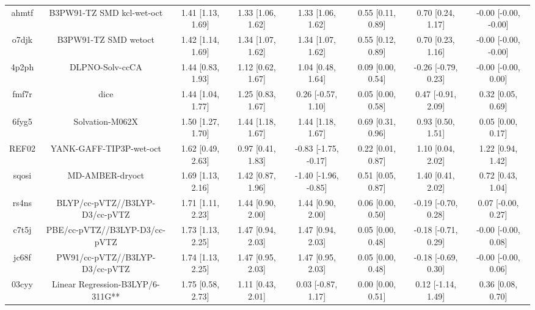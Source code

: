 \documentclass{article}
\begin{document}
\begin{center}
\begin{longtable}{|cccccccc|}
 ahmtf &                          B3PW91-TZ SMD kcl-wet-oct &  1.41 [1.13, 1.69] &  1.33 [1.06, 1.62] &     1.33 [1.06, 1.62] &  0.55 [0.11, 0.89] &    0.70 [0.24, 1.17] &  -0.00 [-0.00, -0.00] \\
 o7djk &                               B3PW91-TZ SMD wetoct &  1.42 [1.14, 1.69] &  1.34 [1.07, 1.62] &     1.34 [1.07, 1.62] &  0.55 [0.12, 0.89] &    0.70 [0.23, 1.16] &  -0.00 [-0.00, -0.00] \\
 4p2ph &                                    DLPNO-Solv-ccCA &  1.44 [0.83, 1.93] &  1.12 [0.62, 1.67] &     1.04 [0.48, 1.64] &  0.09 [0.00, 0.54] &  -0.26 [-0.79, 0.23] &   -0.00 [-0.00, 0.00] \\
 fmf7r &                                               dice &  1.44 [1.04, 1.77] &  1.25 [0.83, 1.67] &    0.26 [-0.57, 1.10] &  0.05 [0.00, 0.58] &   0.47 [-0.91, 2.09] &     0.32 [0.05, 0.69] \\
 6fyg5 &                                    Solvation-M062X &  1.50 [1.27, 1.70] &  1.44 [1.18, 1.67] &     1.44 [1.18, 1.67] &  0.69 [0.31, 0.96] &    0.93 [0.50, 1.51] &     0.05 [0.00, 0.17] \\
 REF02 &                            YANK-GAFF-TIP3P-wet-oct &  1.62 [0.49, 2.63] &  0.97 [0.41, 1.83] &  -0.83 [-1.75, -0.17] &  0.22 [0.01, 0.87] &    1.10 [0.04, 2.02] &     1.22 [0.94, 1.42] \\
 sqosi &                                    MD-AMBER-dryoct &  1.69 [1.13, 2.16] &  1.42 [0.87, 1.96] &  -1.40 [-1.96, -0.85] &  0.51 [0.05, 0.87] &    1.40 [0.41, 2.02] &     0.72 [0.43, 1.04] \\
 rs4ns &                     BLYP/cc-pVTZ//B3LYP-D3/cc-pVTZ &  1.71 [1.11, 2.23] &  1.44 [0.90, 2.00] &     1.44 [0.90, 2.00] &  0.06 [0.00, 0.50] &  -0.19 [-0.70, 0.28] &    0.07 [-0.00, 0.27] \\
 c7t5j &                      PBE/cc-pVTZ//B3LYP-D3/cc-pVTZ &  1.73 [1.13, 2.25] &  1.47 [0.94, 2.03] &     1.47 [0.94, 2.03] &  0.05 [0.00, 0.48] &  -0.18 [-0.71, 0.29] &   -0.00 [-0.00, 0.08] \\
 jc68f &                     PW91/cc-pVTZ//B3LYP-D3/cc-pVTZ &  1.74 [1.13, 2.25] &  1.47 [0.95, 2.03] &     1.47 [0.95, 2.03] &  0.05 [0.00, 0.48] &  -0.18 [-0.69, 0.30] &   -0.00 [-0.00, 0.06] \\
 03cyy &                   Linear Regression-B3LYP/6-311G** &  1.75 [0.58, 2.73] &  1.11 [0.43, 2.01] &    0.03 [-0.87, 1.17] &  0.00 [0.00, 0.51] &   0.12 [-1.14, 1.49] &     0.36 [0.08, 0.70] \\

\end{longtable}
\end{center}
\end{document}
